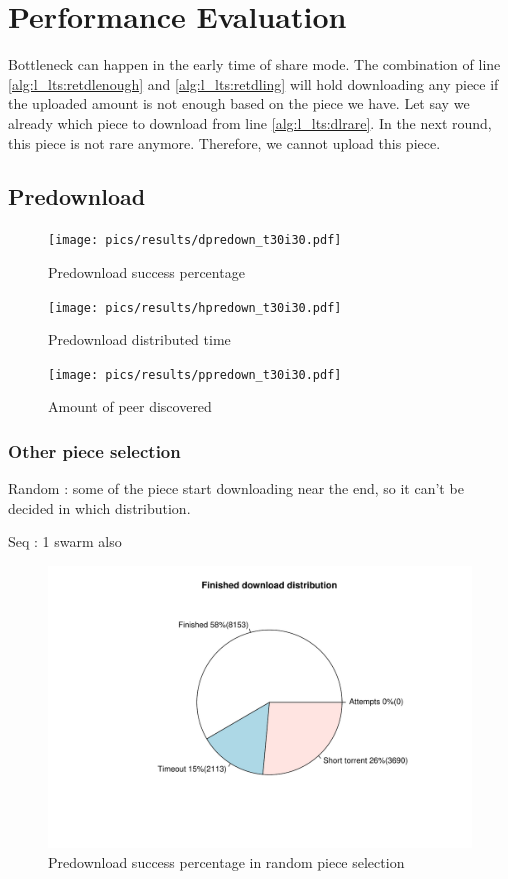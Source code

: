 \chapter{Performance Evaluation}
\label{chp:perfeval}

Bottleneck can happen in the early time of share mode. The combination of line \ref{alg:l_lts:retdlenough} and \ref{alg:l_lts:retdling} will hold downloading any piece if the uploaded amount is not enough based on the piece we have. Let say we already which piece to download from line \ref{alg:l_lts:dlrare}. In the next round, this piece is not rare anymore. Therefore, we cannot upload this piece. 

\section{Predownload}
\begin{figure}[h]
	\centering
	\texttt{[image: pics/results/dpredown\_t30i30.pdf]}
	\caption{Predownload success percentage}
	\label{fig:predownprecent}
\end{figure}

\begin{figure}[h]
	\centering
	\texttt{[image: pics/results/hpredown\_t30i30.pdf]}
	\caption{Predownload distributed time}
	\label{fig:predownhist}
\end{figure}

\begin{figure}[h]
	\centering
	\texttt{[image: pics/results/ppredown\_t30i30.pdf]}
	\caption{Amount of peer discovered}
	\label{fig:peeramount}
\end{figure}
\subsection{Other piece selection}
Random : some of the piece start downloading near the end, so it can't be decided in which distribution.

Seq : 1 swarm also

\begin{figure}[h]
	\centering
	\includegraphics[width=\textwidth]{pics/results/dpredown_random.pdf}
	\caption{Predownload success percentage in random piece selection}
	\label{fig:predownprandom}
\end{figure}

